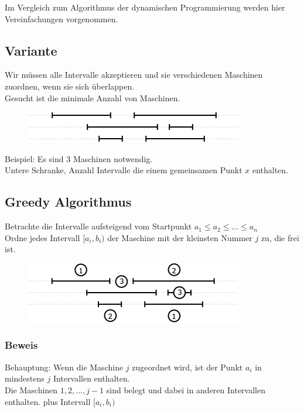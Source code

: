 Im Vergleich zum Algorithmus der dynamischen Programmierung werden hier Vereinfachungen vorgenommen. 
\subsection{Variante}
Wir müssen alle Intervalle akzeptieren und sie verschiedenen Maschinen zuordnen, wenn sie sich überlappen.\\
Gesucht ist die minimale Anzahl von Maschinen.\\
\begin{figure}[h]
    \begin{center}
        \includegraphics[width=\textwidth / 2]{../GFX/vl13_40.png}
        \label{fig:vl13_1}
    \end{center}
\end{figure}
Beispiel: Es sind 3 Maschinen notwendig.\\
Untere Schranke, Anzahl Intervalle die einem gemeinsamen Punkt $x$ enthalten.\\
\subsection{Greedy Algorithmus}
Betrachte die Intervalle aufsteigend vom Startpunkt $a_1 \leq a_2 \leq ...\leq a_n$\\
Ordne jedes Intervall $[a_i,b_i)$ der Maschine mit der kleinsten Nummer $j$ zu, die frei ist.\\
\begin{figure}[h]
    \begin{center}
        \includegraphics[width=\textwidth / 2]{../GFX/vl13_4.png}
        \label{fig:vl13_1}
    \end{center}
\end{figure}
\subsubsection{Beweis}
Behauptung: Wenn die Maschine $j$ zugeordnet wird, ist der Punkt $a_i$ in mindestens $j$ Intervallen enthalten.\\
Die Maschinen $1,2,...,j-1$ sind belegt und dabei in anderen Intervallen enthalten. plus Intervall $[a_i,b_i)$\\
